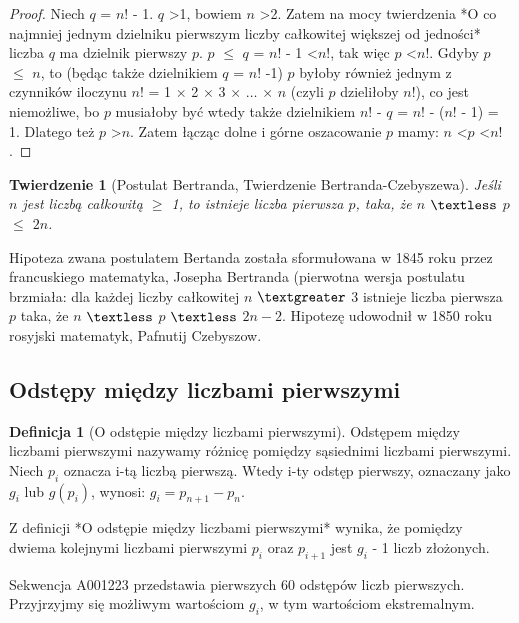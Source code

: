\documentclass[10pt,onecolumn]{article}
\newtheorem{theorem}{Twierdzenie}
\theoremstyle{definition}
\newtheorem{definition}{Definicja}
\theoremstyle{hypothesis}
\theoremstyle{capability}
\begin{document}
\begin{proof}
Niech $q$ = $n!$ - 1. $q$ \textgreater 1, bowiem $n$ \textgreater 2. Zatem na mocy twierdzenia *O co najmniej jednym dzielniku pierwszym liczby całkowitej większej od jedności* liczba $q$ ma dzielnik pierwszy $p$. $p$ $\leq$ $q$ = $n!$ - 1 \textless $n!$, tak więc $p$ \textless $n!$. Gdyby $p$ $\leq$ $n$, to (będąc także dzielnikiem $q$ = $n!$ -1) $p$ byłoby również jednym z czynników iloczynu $n!$ = 1 $\times$ 2 $\times$ 3 $\times$ $\ldots$ $\times$ $n$ (czyli $p$ dzieliłoby $n!$), co jest niemożliwe, bo $p$ musiałoby być wtedy także dzielnikiem $n!$ - $q$ = $n!$ - ($n!$ - 1) = 1. Dlatego też $p$ \textgreater $n$. Zatem łącząc dolne i górne oszacowanie $p$ mamy: $n$ \textless $p$ \textless $n!$.
\end{proof}

\begin{theorem}[Postulat Bertranda, Twierdzenie Bertranda-Czebyszewa]
Jeśli $n$ jest liczbą całkowitą $\geq$ 1, to istnieje liczba pierwsza $p$, taka, że $n$ $\textless$ $p$ $\leq$ $2n$.
\end{theorem}

Hipoteza zwana postulatem Bertanda została sformułowana w 1845 roku przez francuskiego matematyka, Josepha Bertranda (pierwotna wersja postulatu brzmiała:  dla każdej liczby całkowitej $n$ $\textgreater$ $3$ istnieje liczba pierwsza $p$ taka, że $n$ $\textless$ $p$ $\textless$ $2n-2$. Hipotezę udowodnił w 1850 roku rosyjski matematyk, Pafnutij Czebyszow.

\subsection{Odstępy między liczbami pierwszymi}

\begin{definition} [O odstępie między liczbami pierwszymi]
Odstępem między liczbami pierwszymi nazywamy różnicę pomiędzy sąsiednimi liczbami pierwszymi.	 Niech $p_i$ oznacza i-tą liczbą pierwszą. Wtedy i-ty odstęp pierwszy, oznaczany jako $g_i$ lub $g(p_i)$, wynosi: $g_i = p_{n+1} - p_n$.
\end{definition}

Z definicji *O odstępie między liczbami pierwszymi* wynika, że pomiędzy dwiema kolejnymi liczbami pierwszymi $p_i$ oraz $p_{i+1}$ jest $g_i$ - 1 liczb złożonych. \par

Sekwencja A001223 przedstawia pierwszych 60 odstępów liczb pierwszych. Przyjrzyjmy się możliwym wartościom $g_i$, w tym wartościom ekstremalnym.
\end{document}
